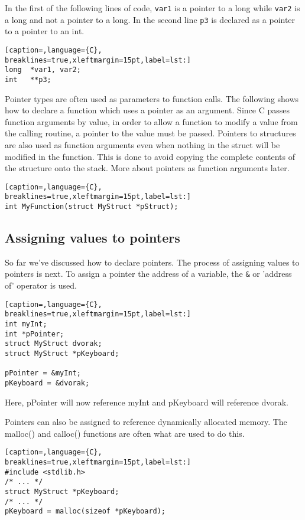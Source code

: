 In the first of the following lines of code, \texttt{var1} is a pointer to a
long while \texttt{var2} is a long and not a pointer to a long. In the second
line \texttt{p3} is declared as a pointer to a pointer to an int.
\lstset{basicstyle=\scriptsize, numbers=left, captionpos=b, tabsize=4}
\begin{lstlisting}[caption=,language={C},
breaklines=true,xleftmargin=15pt,label=lst:]
long  *var1, var2;
int   **p3;
\end{lstlisting}

Pointer types are often used as parameters to function calls. The following
shows how to declare a function which uses a pointer as an argument. Since C
passes function arguments by value, in order to allow a function to modify a
value from the calling routine, a pointer to the value must be passed. Pointers
to structures are also used as function arguments even when nothing in the
struct will be modified in the function. This is done to avoid copying the
complete contents of the structure onto the stack. More about pointers as
function arguments later.
\lstset{basicstyle=\scriptsize, numbers=left, captionpos=b, tabsize=4}
\begin{lstlisting}[caption=,language={C},
breaklines=true,xleftmargin=15pt,label=lst:]
int MyFunction(struct MyStruct *pStruct);
\end{lstlisting}

\subsection{Assigning values to pointers}
So far we've discussed how to declare pointers. The process of assigning values
to pointers is next. To assign a pointer the address of a variable, the
\texttt{\&} or 'address of' operator is used. 
\lstset{basicstyle=\scriptsize, numbers=left, captionpos=b, tabsize=4}
\begin{lstlisting}[caption=,language={C},
breaklines=true,xleftmargin=15pt,label=lst:]
int myInt;
int *pPointer;
struct MyStruct dvorak;
struct MyStruct *pKeyboard;
 
pPointer = &myInt;
pKeyboard = &dvorak;
\end{lstlisting}

Here, pPointer will now reference myInt and pKeyboard will reference dvorak.

Pointers can also be assigned to reference dynamically allocated memory. The
malloc() and calloc() functions are often what are used to do this.
\lstset{basicstyle=\scriptsize, numbers=left, captionpos=b, tabsize=4}
\begin{lstlisting}[caption=,language={C},
breaklines=true,xleftmargin=15pt,label=lst:]
#include <stdlib.h>
/* ... */
struct MyStruct *pKeyboard;
/* ... */
pKeyboard = malloc(sizeof *pKeyboard);
\end{lstlisting}

